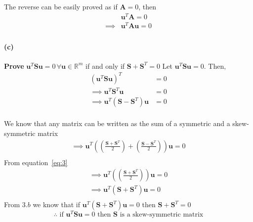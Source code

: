 \documentclass[12pt, letterpaper]{article}
\begin{document}
The reverse can be easily proved as if $\mathbf{A} = 0$, then
\[
  \begin{split}
  &\mathbf{u}^T\mathbf{A} = 0\\
    \implies &\boxed{\mathbf{u}^T\mathbf{Au} = 0}\\
  \end{split}
\]

\paragraph{(c)} \textbf{Prove} $\mathbf{u}^T\mathbf{Su} = 0\,\forall \mathbf{u} \in \mathbb{R}^m$ if and only if $\mathbf{S} + \mathbf{S}^T = 0$
\newline\newline
Let $\mathbf{u}^T\mathbf{Su} = 0$. Then,
\begin{equation}
  \label{eq:3}
  \begin{split}
    (\mathbf{u}^T\mathbf{Su})^T &= 0\\
    \implies \mathbf{u}^T\mathbf{S}^T\mathbf{u} &= 0\\
    \implies \mathbf{u}^T(\mathbf{S} - \mathbf{S}^T)\mathbf{u} &= 0\\
\end{split}
\end{equation}

We know that any matrix can be written as the sum of a symmetric and a skew-symmetric matrix
\begin{align*}
  \implies \mathbf{u}^T\left(
    \left(\frac{\mathbf{S} + \mathbf{S}^T}{2}\right)
    + \left(\frac{\mathbf{S} - \mathbf{S}^T}{2}\right)
  \right)\mathbf{u} = 0\\
\end{align*}
From equation~\eqref{eq:3} 
\begin{align*}
  \implies \mathbf{u}^T\left(
    \left(\frac{\mathbf{S} + \mathbf{S}^T}{2}\right)
  \right)\mathbf{u} = 0\\
  \implies \mathbf{u}^T\left(\mathbf{S} + \mathbf{S}^T \right)\mathbf{u} = 0\\
\end{align*}
From $3.b$ we know that if $\mathbf{u}^T(\mathbf{S} + \mathbf{S}^T)\mathbf{u} = 0$ then $\mathbf{S} + \mathbf{S}^T = 0$
\[\boxed{\therefore \text{ if }\mathbf{u}^T\mathbf{Su} = 0\text{ then }\mathbf{S}\text{ is a skew-symmetric matrix}}\]
\newline
\end{document}
